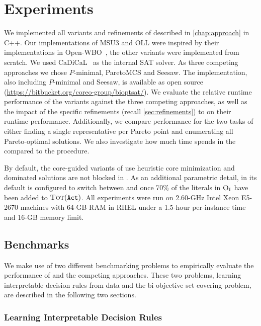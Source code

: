 \chapter{Experiments\label{chap:experiments}}

We implemented  all variants and refinements of \algname{} described in \cref{chap:approach} in C++.
Our implementations of MSU3 and OLL were inspired by their implementations in Open-WBO~\autocite{DBLP:conf/sat/MartinsML14}, the other variants were implemented from scratch.
We used CaDiCaL~\autocite{BiereFazekasFleuryHeisinger-SAT-Competition-2020-solvers} as the internal SAT solver.
As three competing approaches we chose $P$-minimal, ParetoMCS and Seesaw.
The implementation, also including $P$-minimal and Seesaw, is available as open source ({\small\url{https://bitbucket.org/coreo-group/bioptsat/}}).
We evaluate the relative runtime performance of the \algname{} variants against the three competing approaches, as well as the impact of the specific refinements (recall \cref{sec:refinements}) to \algname{} on their runtime performance.
Additionally, we compare performance for the two tasks of either finding a single representative per Pareto point and enumerating all Pareto-optimal solutions.
We also investigate how much time \algname{} spends in the \Min{} compared to the \Simpr{} procedure.

By default, the core-guided variants of \algname{} use heuristic core minimization and dominated solutions are not blocked in \satunsat{}.
As an additional parametric detail, in its default \msh{} is configured to switch between \msu{} and \satunsat{} once 70\% of the literals in $\textsc{O}_{\text{I}}$ have been added to $\textsc{Tot}(\texttt{Act})$.
All experiments were run on 2.60-GHz Intel Xeon E5-2670 machines with 64-GB RAM in RHEL under a 1.5-hour per-instance time and 16-GB memory limit.

\section{Benchmarks\label{sec:benchmarks}}

We make use of two different benchmarking problems to empirically evaluate the performance of \algname{} and the competing approaches.
These two problems, learning interpretable decision rules from data and the bi-objective set covering problem, are described in the following two sections.

\subsection{Learning Interpretable Decision Rules\label{sec:lidr}}

